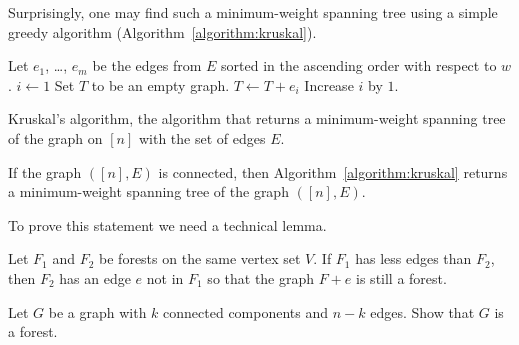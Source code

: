 Surprisingly, one may find such a minimum-weight spanning tree using a simple
greedy algorithm (Algorithm~\ref{algorithm:kruskal}).
\begin{algorithm}
  \begin{algorithmic}[1]
      \State Let $e_1$, \dots, $e_m$ be the edges from $E$ sorted in the
        ascending order with respect to $w$.
      \State $i \gets 1$
      \State Set $T$ to be an empty graph.
          \State $T \gets T + e_i$
        \EndIf
        \State Increase $i$ by $1$.
      \EndWhile
      \State {}
    \EndFunction
  \end{algorithmic}
  \caption{Kruskal's algorithm, the algorithm that returns a minimum-weight
  spanning tree of the graph on $[n]$ with the set of edges $E$.}
  \label{algorithm:kruskal}
\end{algorithm}

\begin{theorem}
  If the graph $([n], E)$ is connected, then Algorithm~\ref{algorithm:kruskal}
  returns a minimum-weight spanning tree of the graph $([n], E)$.
\end{theorem}

To prove this statement we need a technical lemma.
\begin{lemma}
  Let $F_1$ and $F_2$ be forests on the same vertex set $V$. If $F_1$ has less
  edges than $F_2$, then $F_2$ has an edge $e$ not in $F_1$ so
  that the graph $F + e$ is still a forest.
\end{lemma}



\begin{chapterendexercises}
  \exercise[recommended] Let $G$ be a graph with $k$ connected components and
    $n - k$ edges. Show that $G$ is a forest.
\end{chapterendexercises}
